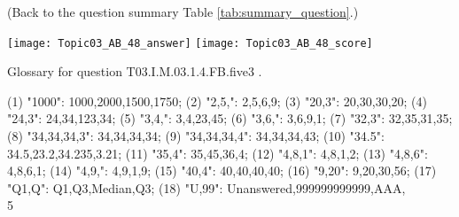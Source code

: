 \documentclass[12pt,english,nohyper]{tufte-handout}\usepackage[]{graphicx}\usepackage[]{color}
\begin{document}
 (Back to the question summary Table \ref{tab:summary_question}.)

\begin{center} \texttt{[image: Topic03\_AB\_48\_answer]} \texttt{[image: Topic03\_AB\_48\_score]} \end{center} 

Glossary for question T03.I.M.03.1.4.FB.five3 .

(1) "1000": 1000,2000,1500,1750; (2) "2,5,": 2,5,6,9; (3) "20,3": 20,30,30,20; (4) "24,3": 24,34,123,34; (5) "3,4,": 3,4,23,45; (6) "3,6,": 3,6,9,1; (7) "32,3": 32,35,31,35; (8) "34,34,34,3": 34,34,34,34; (9) "34,34,34,4": 34,34,34,43; (10) "34.5": 34.5,23.2,34.235,3.21; (11) "35,4": 35,45,36,4; (12) "4,8,1": 4,8,1,2; (13) "4,8,6": 4,8,6,1; (14) "4,9,": 4,9,1,9; (15) "40,4": 40,40,40,40; (16) "9,20": 9,20,30,56; (17) "Q1,Q": Q1,Q3,Median,Q3; (18) "U,99": Unanswered,999999999999,AAA,\\5
\end{document}
